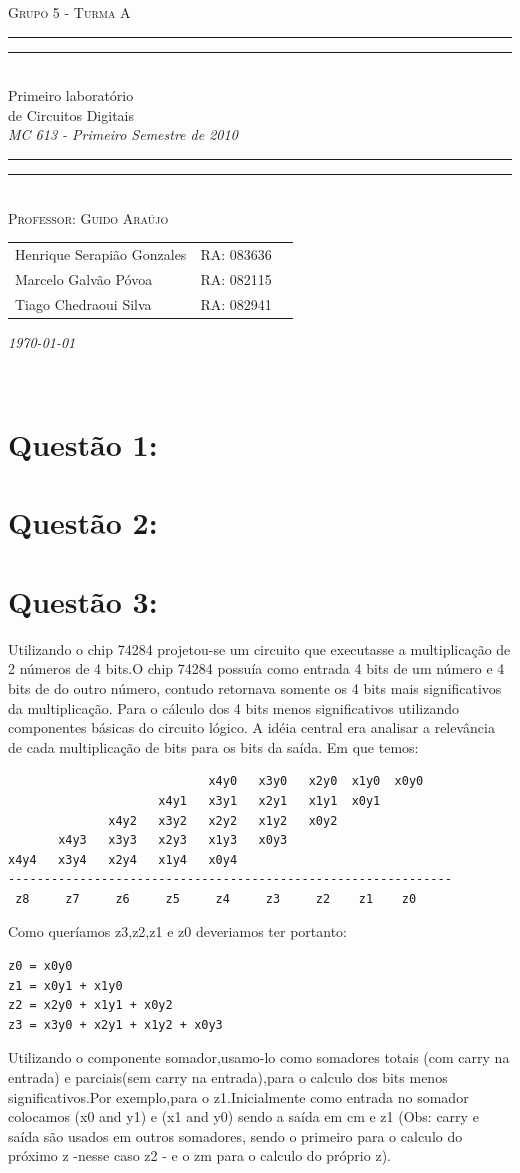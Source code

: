 \documentclass[10pt, letterpaper]{article}
\numberwithin{table}{section}
\numberwithin{figure}{section}
\newcommand*{\titleTMB}{\begingroup
\centering
\settowidth{\unitlength}{\LARGE MC 613}
\vspace*{\baselineskip}
{\large\scshape  Grupo 5 - Turma A}\\[\baselineskip]
\rule{11.0cm}{1.6pt}\vspace*{-\baselineskip}\vspace*{2pt}
\rule{11.0cm}{0.4pt}\\[\baselineskip]
{\LARGE Primeiro laboratório }\\[0.2\baselineskip]
{\LARGE de Circuitos Digitais}\\[0.2\baselineskip]
{\itshape MC 613 - Primeiro Semestre de 2010}\\[0.2\baselineskip]
\rule{11.0cm}{0.4pt}\vspace*{-\baselineskip}\vspace{3.2pt}
\rule{11.0cm}{1.6pt}\\[\baselineskip]
{\large\scshape Professor: Guido Araújo}\par
\vfill
{\normalsize   \scshape 

\begin{center}
	\begin{tabular}{  l  l  p{5cm} }
		Henrique Serapião Gonzales     &  RA: 083636 \\
		Marcelo Galvão Póvoa & RA: 082115\\
		Tiago Chedraoui Silva      & RA: 082941\\ 
		
	\end{tabular}
\end{center}

\itshape \today }\\[\baselineskip]
\vspace{3.2pt}
\endgroup}
\begin{document}
\begin{titlepage} 
\titleTMB
\end{titlepage} 
\newpage

\newpage
\section{Quest\~ao 1:}


\newpage
\section{Quest\~ao 2:}



\newpage
\section{Quest\~ao 3:}

Utilizando o chip 74284 projetou-se um circuito que executasse a multiplicação de 2 números de 4 bits.O chip 74284 possuía como entrada 4 bits de um número e 4 bits de do outro número, contudo retornava somente os 4 bits mais significativos da multiplicação. Para o cálculo dos 4 bits menos significativos utilizando componentes básicas do circuito lógico.
A idéia central era analisar a relevância de cada multiplicação de bits para os bits da saída.
Em que temos:
\begin{verbatim}
                            x4y0   x3y0   x2y0  x1y0  x0y0
                     x4y1   x3y1   x2y1   x1y1  x0y1
              x4y2   x3y2   x2y2   x1y2   x0y2
       x4y3   x3y3   x2y3   x1y3   x0y3
x4y4   x3y4   x2y4   x1y4   x0y4
--------------------------------------------------------------
 z8     z7     z6     z5     z4     z3     z2    z1    z0
\end{verbatim}
Como queríamos z3,z2,z1 e z0 deveriamos ter portanto:
\begin{verbatim}
z0 = x0y0
z1 = x0y1 + x1y0
z2 = x2y0 + x1y1 + x0y2
z3 = x3y0 + x2y1 + x1y2 + x0y3
\end{verbatim}
Utilizando o componente somador,usamo-lo como somadores totais (com carry na entrada) e parciais(sem carry na entrada),para o calculo dos bits menos significativos.Por exemplo,para o z1.Inicialmente como entrada no somador colocamos (x0 and y1) e (x1 and y0) sendo a sa\'ida em cm e z1 (Obs: carry e sa\'ida são usados em outros somadores, sendo o primeiro para o calculo do próximo z -nesse caso z2 - e o zm para o calculo do próprio z).
\end{document}
